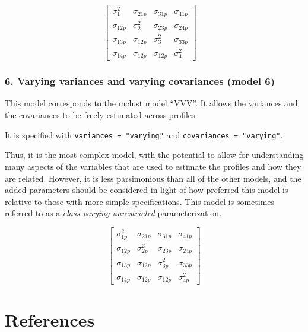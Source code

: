 \documentclass[man]{apa6}
\begin{document}
\[
\left[ \begin{matrix} { \sigma  }_{ 1 }^{ 2 } & { \sigma  }_{ 21p } & { \sigma  }_{ 31p } & { \sigma  }_{ 41p } \\ { \sigma  }_{ 12p } & { \sigma  }_{ 2 }^{ 2 } & { \sigma  }_{ 23p } & { \sigma  }_{ 24p } \\ { \sigma  }_{ 13p } & { \sigma  }_{ 12p } & { \sigma  }_{ 3 }^{ 2 } & { \sigma  }_{ 33p } \\ { \sigma  }_{ 14p } & { \sigma  }_{ 12p } & { \sigma  }_{ 12p } & { \sigma  }_{ 4 }^{ 2 } \end{matrix} \right] \quad 
\]

\hypertarget{varying-variances-and-varying-covariances-model-6}{%
\subsubsection{6. Varying variances and varying covariances (model 6)}\label{varying-variances-and-varying-covariances-model-6}}

This model corresponds to the mclust model \enquote{VVV}. It allows the variances and the covariances to be freely estimated across profiles.

It is specified with \texttt{variances\ =\ "varying"} and \texttt{covariances\ =\ "varying"}.

Thus, it is the most complex model, with the potential to allow for understanding many aspects of the variables that are used to estimate the profiles and how they are related. However, it is less parsimonious than all of the other models, and the added parameters should be considered in light of how preferred this model is relative to those with more simple specifications. This model is sometimes referred to as a \emph{class-varying unrestricted} parameterization.

\[
\left[ \begin{matrix} { \sigma  }_{ 1p }^{ 2 } & { \sigma  }_{ 21p } & { \sigma  }_{ 31p } & { \sigma  }_{ 41p } \\ { \sigma  }_{ 12p } & { \sigma  }_{ 2p }^{ 2 } & { \sigma  }_{ 23p } & { \sigma  }_{ 24p } \\ { \sigma  }_{ 13p } & { \sigma  }_{ 12p } & { \sigma  }_{ 3p }^{ 2 } & { \sigma  }_{ 33p } \\ { \sigma  }_{ 14p } & { \sigma  }_{ 12p } & { \sigma  }_{ 12p } & { \sigma  }_{ 4p }^{ 2 } \end{matrix} \right] 
\]

\hypertarget{references}{%
\section{References}\label{references}}
\end{document}
